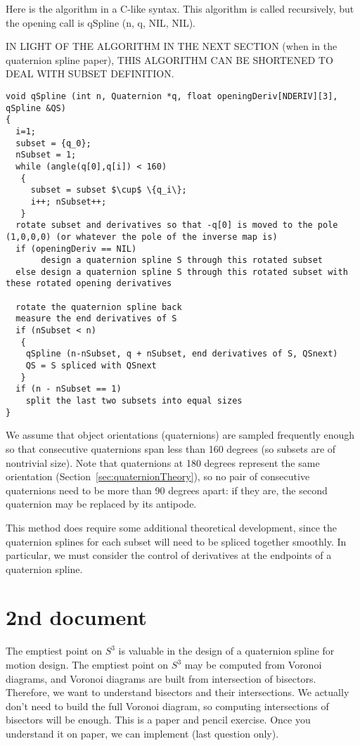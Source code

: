 \documentclass[12pt]{article}
\begin{document}
Here is the algorithm in a C-like syntax.
This algorithm is called recursively, but the opening call is qSpline (n, q, NIL, NIL).

IN LIGHT OF THE ALGORITHM IN THE NEXT SECTION (when in the quaternion spline paper), 
THIS ALGORITHM CAN BE SHORTENED TO DEAL WITH SUBSET DEFINITION.

\begin{verbatim}
void qSpline (int n, Quaternion *q, float openingDeriv[NDERIV][3], qSpline &QS)
{
  i=1;
  subset = {q_0};
  nSubset = 1;
  while (angle(q[0],q[i]) < 160)
   {
     subset = subset $\cup$ \{q_i\};
     i++; nSubset++;
   }
  rotate subset and derivatives so that -q[0] is moved to the pole (1,0,0,0) (or whatever the pole of the inverse map is)
  if (openingDeriv == NIL)
       design a quaternion spline S through this rotated subset
  else design a quaternion spline S through this rotated subset with these rotated opening derivatives
  
  rotate the quaternion spline back
  measure the end derivatives of S
  if (nSubset < n)
   {
    qSpline (n-nSubset, q + nSubset, end derivatives of S, QSnext)
    QS = S spliced with QSnext
   }
  if (n - nSubset == 1)
    split the last two subsets into equal sizes
}
\end{verbatim}

We assume that object orientations (quaternions) are sampled frequently enough
so that consecutive quaternions span less than 160 degrees
(so subsets are of nontrivial size).
Note that quaternions at 180 degrees represent the same orientation (Section~\ref{sec:quaternionTheory}),
so no pair of consecutive quaternions need to be more than 90 degrees apart:
if they are, the second quaternion may be replaced by its antipode.

This method does require some additional theoretical development,
since the quaternion splines for each subset will need to be spliced 
together smoothly.
In particular, we must consider the control of derivatives at the endpoints of a
quaternion spline.

\clearpage

\section{2nd document}

The emptiest point on $S^3$ is valuable in the design of a quaternion
spline for motion design.
The emptiest point on $S^3$ may be computed from Voronoi diagrams,
and Voronoi diagrams are built from intersection of bisectors.
Therefore, we want to understand bisectors and their intersections.
We actually don't need to build the full Voronoi diagram, 
so computing intersections of bisectors will be enough.
This is a paper and pencil exercise.  Once you understand it on paper,
we can implement (last question only).
\end{document}
